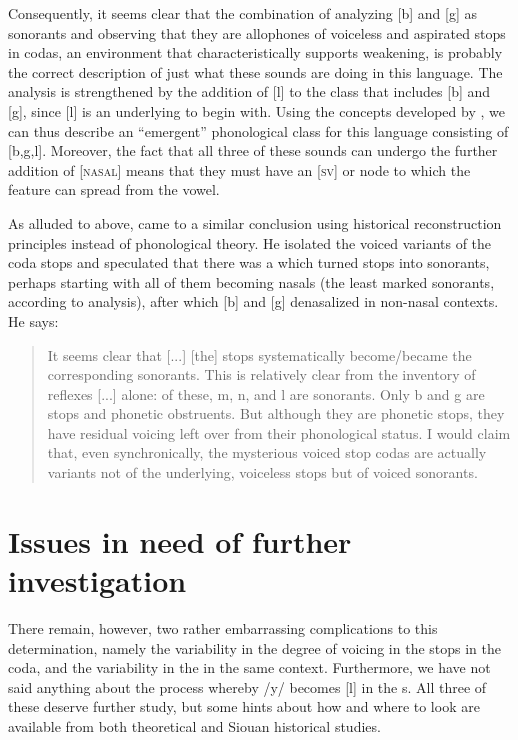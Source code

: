 \documentclass[output=paper]{LSP/langsci}
\begin{document}
Consequently, it seems clear that the combination of analyzing [b] and [g] as sonorants and observing that they are allophones of voiceless and aspirated stops in codas, an environment that characteristically supports weakening, is probably the correct description of just what these sounds are doing in this language. The analysis is strengthened by the addition of [l] to the class that includes [b] and [g], since [l] is an underlying  to begin with. Using the concepts developed by \citet{Mielke2008}, we can thus describe an ``emergent'' phonological class for this language consisting of [b,g,l]. Moreover, the fact that all three of these sounds can undergo the further addition of [\textsc{nasal}] means that they must have an [\textsc{sv}] or  node to which the feature can spread from the vowel.

As alluded to above, \citet[5]{Rankin2001} came to a similar conclusion using historical reconstruction principles instead of phonological theory. He isolated the voiced variants of the coda stops and speculated that there was a  which turned stops into sonorants, perhaps starting with all of them becoming nasals (the least marked sonorants, according to  analysis), after which [b] and [g] denasalized in non-nasal contexts. He says: 
\begin{quote}It seems clear that [...] [the] stops systematically become/became the corresponding sonorants. This is relatively clear from the inventory of reflexes [...] alone: of these, m, n,  and l are sonorants. Only b and g are stops and phonetic obstruents. But although they are phonetic stops, they have residual voicing left over from their  phonological status. I would claim that, even synchronically, the mysterious voiced stop codas are actually variants not of the underlying, voiceless stops but of voiced sonorants.\end{quote}

\section{Issues in need of further investigation}

There remain, however, two rather embarrassing complications to this determination, namely the variability in the degree of voicing in the stops in the coda, and the variability in the  in the same context. Furthermore, we have not said anything about the process whereby /y/ becomes [l] in the  s. All three of these deserve further study, but some hints about how and where to look are available from both theoretical  and Siouan historical studies.
\end{document}
